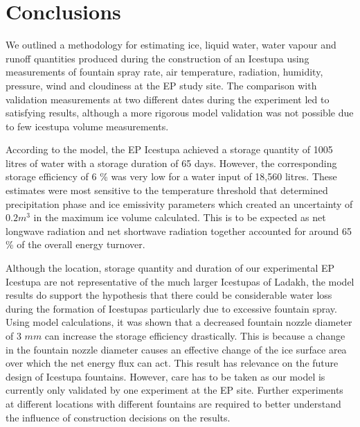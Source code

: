 \documentclass[utf8]{frontiersSCNS} %
\begin{document}

\section{Conclusions} We outlined a methodology for estimating ice, liquid water, water vapour and runoff
quantities produced during the construction of an Icestupa using measurements of fountain spray rate, air temperature,
radiation, humidity, pressure, wind and cloudiness at the EP study site. The comparison with validation
measurements at two different dates during the experiment led to satisfying results, although a more rigorous model
validation was not possible due to few icestupa volume measurements.

According to the model, the EP Icestupa achieved a storage quantity of 1005 litres of water with a storage
duration of 65 days. However, the corresponding storage efficiency of 6 \% was very low for a water input of 18,560
litres. These estimates were most sensitive to the temperature threshold that determined precipitation phase and ice
emissivity parameters which created an uncertainty of $0.2 m^3$ in the maximum ice volume calculated.  This is
to be expected as net longwave radiation and net shortwave radiation together accounted for around 65 \% of the overall
energy turnover.

Although the location, storage quantity and duration of our experimental EP Icestupa are not representative of
the much larger Icestupas of Ladakh, the model results do support the hypothesis that there could be considerable
water loss during the formation of Icestupas particularly due to excessive fountain spray. Using model calculations,
it was shown that a decreased fountain nozzle diameter of 3 $mm$ can increase the storage efficiency drastically. This
is because a change in the fountain nozzle diameter causes an effective change of the ice surface area over which the
net energy flux can act. This result has relevance on the future design of Icestupa fountains. However, care has to be
taken as our model is currently only validated by one experiment at the EP site. Further experiments at
different locations with different fountains are required to better understand the influence of construction decisions
on the results. 
\end{document}
